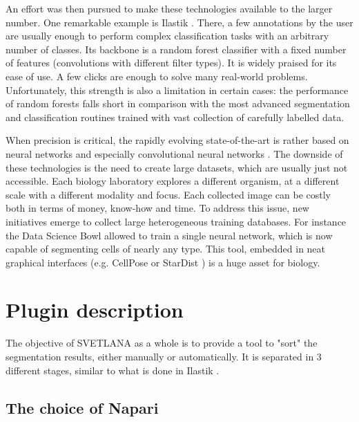 \documentclass{article}
\begin{document}
An effort was then pursued to make these technologies available to the larger number. One remarkable example is Ilastik \cite{berg2019ilastik}. There, a few annotations by the user are usually enough to perform complex classification tasks with an arbitrary number of classes. Its backbone is a random forest classifier with a fixed number of features (convolutions with different filter types). It is widely praised for its ease of use. A few clicks are enough to solve many real-world problems. Unfortunately, this strength is also a limitation in certain cases: the performance of random forests falls short in comparison with the most advanced segmentation and classification routines trained with vast collection of carefully labelled data. 

When precision is critical, the rapidly evolving state-of-the-art is rather based on neural networks and especially convolutional neural networks \cite{dhillon2020convolutional,8237584}. The downside of these technologies is the need to create large datasets, which are usually just not accessible. Each biology laboratory explores a different organism, at a different scale with a different modality and focus. Each collected image can be costly both in terms of money, know-how and time. To address this issue, new initiatives emerge to collect large heterogeneous training databases. For instance the Data Science Bowl \cite{caicedo2019nucleus} allowed to train a single neural network, which is now capable of segmenting cells of nearly any type. This tool, embedded in neat graphical interfaces (e.g. CellPose \cite{stringer2021cellpose} or StarDist \cite{fazeli2020automated}) is a huge asset for biology. 


\section{Plugin description}
\label{sec:format}
{}
The objective of SVETLANA as a whole is to provide a tool to "sort" the segmentation results, either manually or automatically. 
It is separated in 3 different stages, similar to what is done in Ilastik \cite{berg2019ilastik}. 

\subsection{The choice of Napari}
\end{document}
